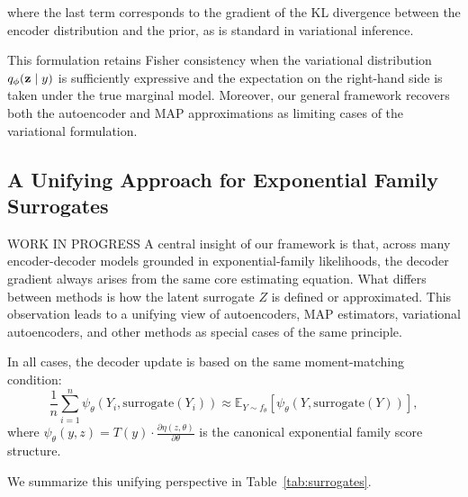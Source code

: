 \documentclass[twoside,11pt]{article}
\begin{document}
where the last term corresponds to the gradient of the KL divergence between the encoder distribution and the prior, as is standard in variational inference.

This formulation retains Fisher consistency when the variational distribution \( q_\phi({\bf z} \mid y) \) is sufficiently expressive and the expectation on the right-hand side is taken under the true marginal model. Moreover, our general framework recovers both the autoencoder and MAP approximations as limiting cases of the variational formulation.

\subsection{A Unifying Approach for Exponential Family Surrogates}
{\color{red} WORK IN PROGRESS}
A central insight of our framework is that, across many encoder-decoder models grounded in exponential-family likelihoods, the decoder gradient always arises from the same core estimating equation. What differs between methods is how the latent surrogate \( Z \) is defined or approximated. This observation leads to a unifying view of autoencoders, MAP estimators, variational autoencoders, and other methods as special cases of the same principle.

In all cases, the decoder update is based on the same moment-matching condition:
\[
\frac{1}{n} \sum_{i=1}^n \psi_\theta(Y_i, \text{surrogate}(Y_i)) \approx \mathbb{E}_{Y \sim f_\theta} \left[ \psi_\theta(Y, \text{surrogate}(Y)) \right],
\]
where \( \psi_\theta(y, z) = T(y) \cdot \frac{\partial \eta(z, \theta)}{\partial \theta} \) is the canonical exponential family score structure.

We summarize this unifying perspective in Table~\ref{tab:surrogates}.
\end{document}

